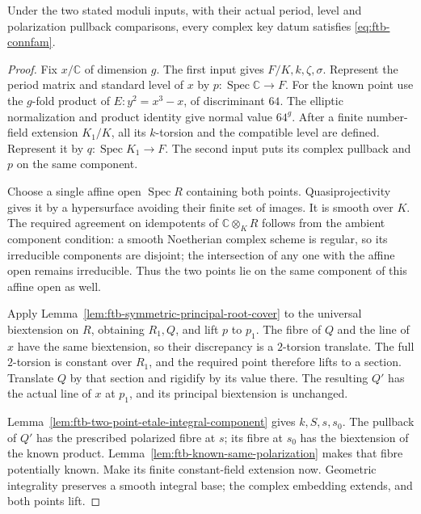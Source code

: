 \begin{srproposition}
\label{prop:ftb-connfam-arithmetic-join}
Under the two stated moduli inputs, with their actual period,
level and polarization pullback comparisons, every complex key
datum satisfies \eqref{eq:ftb-connfam}.
\end{srproposition}
\begin{proof}
Fix \(x/\mathbb C\) of dimension \(g\).
The first input gives \(F/K,k,\zeta,\sigma\).
Represent the period matrix and standard level of \(x\)
by \(p:\operatorname{Spec}\mathbb C\to F\).
For the known point use the \(g\)-fold product of
\(E:y^2=x^3-x\), of discriminant \(64\).
The elliptic normalization and product identity give normal
value \(64^g\).
After a finite number-field extension \(K_1/K\), all its
\(k\)-torsion and the compatible level are defined.
Represent it by \(q:\operatorname{Spec}K_1\to F\).
The second input puts its complex pullback and \(p\) on the
same component.

Choose a single affine open \(\operatorname{Spec}R\) containing
both points.  Quasiprojectivity gives it by a hypersurface
avoiding their finite set of images.
It is smooth over \(K\).
The required agreement on idempotents of
\(\mathbb C\otimes_KR\) follows from the ambient component
condition: a smooth Noetherian complex scheme is regular,
so its irreducible components are disjoint; the intersection
of any one with the affine open remains irreducible.
Thus the two points lie on the same component of this
affine open as well.

Apply Lemma~\ref{lem:ftb-symmetric-principal-root-cover} to the
universal biextension on \(R\), obtaining \(R_1,Q\), and lift
\(p\) to \(p_1\).
The fibre of \(Q\) and the line of \(x\) have the same
biextension, so their discrepancy is a \(2\)-torsion translate.
The full \(2\)-torsion is constant over \(R_1\), and the
required point therefore lifts to a section.
Translate \(Q\) by that section and rigidify by its value
there.  The resulting \(Q'\) has the actual line of \(x\)
at \(p_1\), and its principal biextension is unchanged.

Lemma~\ref{lem:ftb-two-point-etale-integral-component} gives
\(k,S,s,s_0\).
The pullback of \(Q'\) has the prescribed polarized fibre
at \(s\); its fibre at \(s_0\) has the biextension of the
known product.
Lemma~\ref{lem:ftb-known-same-polarization} makes that fibre
potentially known.
Make its finite constant-field extension now.
Geometric integrality preserves a smooth integral base;
the complex embedding extends, and both points lift.


\end{proof}

